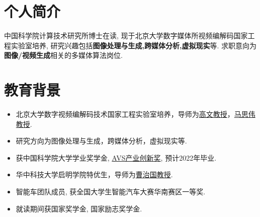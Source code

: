 \documentclass{resume}
\begin{document}


 
\section{个人简介}
中国科学院计算技术研究所博士在读, 现于北京大学数字媒体所视频编解码国家工程实验室培养, 研究兴趣包括\textbf{图像处理与生成,跨媒体分析,虚拟现实}等. 求职意向为\textbf{图像/视频生成}相关的多媒体算法岗位.

\section{教育背景}
\begin{itemize}
  \item 北京大学数字视频编解码技术国家工程实验室培养，导师为\href{http://www.jdl.ac.cn/htm-gaowen/}{高文教授}，\href{https://scholar.google.com/citations?user=y3YqlaUAAAAJ&hl=zh-CN}{马思伟教授}.
  \item 研究方向为图像处理与生成，跨媒体分析，虚拟现实等.
  \item 获中国科学院大学学业奖学金, \href{http://www.avs.org.cn/avs_award/2017.asp}{AVS产业创新奖}, 预计2022年毕业.
\end{itemize}

\begin{itemize}
  \item 华中科技大学启明学院特优生，导师为\href{https://scholar.google.com.sg/citations?user=396o2BAAAAAJ&hl=zh-CN}{曹治国教授}.
  \item 智能车团队成员, 获全国大学生智能汽车大赛华南赛区一等奖.
  \item 就读期间获国家奖学金, 国家励志奖学金.
\end{itemize}
\end{document}
